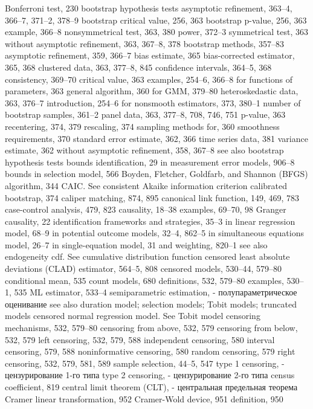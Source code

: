 Bonferroni test, 230 bootstrap hypothesis tests
asymptotic refinement, 363–4, 366–7, 371–2, 378–9
bootstrap critical value, 256, 363 bootstrap p-value, 256, 363 example, 366–8
nonsymmetrical test, 363, 380 power, 372–3
symmetrical test, 363
without asymptotic refinement, 363, 367–8,
378
bootstrap methods, 357–83
asymptotic refinement, 359, 366–7 bias estimate, 365
bias-corrected estimator, 365, 368 clustered data, 363, 377–8, 845 confidence intervals, 364–5, 368 consistency, 369–70
critical value, 363
examples, 254–6, 366–8
for functions of parameters, 363
general algorithm, 360
for GMM, 379–80
heteroskedastic data, 363, 376–7 introduction, 254–6
for nonsmooth estimators, 373, 380–1 number of bootstrap samples, 361–2
panel data, 363, 377–8, 708, 746, 751 p-value, 363
recentering, 374, 379
rescaling, 374
sampling methods for, 360
smoothness requirements, 370
standard error estimate, 362, 366
time series data, 381
variance estimate, 362
without asymptotic refinement, 358, 367–8 see also bootstrap hypothesis tests
bounds identification, 29
in measurement error models, 906–8
bounds in selection model, 566
Boyden, Fletcher, Goldfarb, and Shannon (BFGS)
algorithm, 344
CAIC. See consistent Akaike information criterion calibrated bootstrap, 374
caliper matching, 874, 895
canonical link function, 149, 469, 783 case-control analysis, 479, 823
causality, 18–38
examples, 69–70, 98
Granger causality, 22
identification frameworks and strategies,
35–3
in linear regression model, 68–9
in potential outcome models, 32–4, 862–5 in simultaneous equations model, 26–7
in single-equation model, 31
and weighting, 820–1
see also endogeneity
cdf. See cumulative distribution function
censored least absolute deviations (CLAD) estimator,
564–5, 808
censored models, 530–44, 579–80
conditional mean, 535
count models, 680
definitions, 532, 579–80
examples, 530–1, 535
ML estimator, 533–4
semiparametric estimation, - полупараметрическое оценивание
see also duration model; selection models; Tobit
models; truncated models
censored normal regression model. See Tobit model censoring mechanisms, 532, 579–80
censoring from above, 532, 579 censoring from below, 532, 579 left censoring, 532, 579, 588
independent censoring, 580 interval censoring, 579, 588 noninformative censoring, 580 random censoring, 579
right censoring, 532, 579, 581, 589 sample selection, 44–5, 547
type 1 censoring, - цензурирование 1-го типа
type 2 censoring, - цензурирование 2-го типа 
census coefficient, 819
central limit theorem (CLT), - центральная предельная теорема
Cramer linear transformation, 952 Cramer-Wold device, 951 definition, 950
